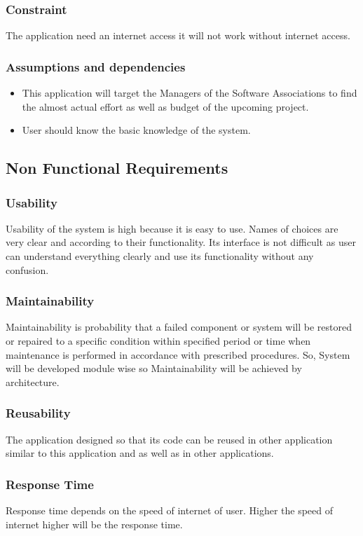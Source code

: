 \subsubsection{Constraint}
The application need an internet access it will not work without internet access.
\subsubsection{Assumptions and dependencies}
\begin{center}
    \begin{itemize}
        \item This application will target the Managers of the Software Associations to find the almost actual effort as well as budget of the upcoming project.
        \item User should know the basic knowledge of the system.
    \end{itemize}
\end{center}
\subsection{Non Functional Requirements}
\subsubsection{Usability}
Usability of the system is high because it is easy to use. Names of choices are very clear and according to their functionality. Its interface is not difficult as user can understand
everything clearly and use its functionality without any confusion.  
\subsubsection{Maintainability}
Maintainability is probability that a failed component or system will be restored or repaired to a specific condition within specified period or time when maintenance is performed in accordance with prescribed procedures. So, System will be developed module wise so Maintainability will be achieved by architecture.
\subsubsection{Reusability}
The application designed so that its code can be reused in other application similar to this application and as well as in other applications.
\subsubsection{Response Time}
Response time depends on the speed of internet of user. Higher the speed of internet higher will be the response time.
